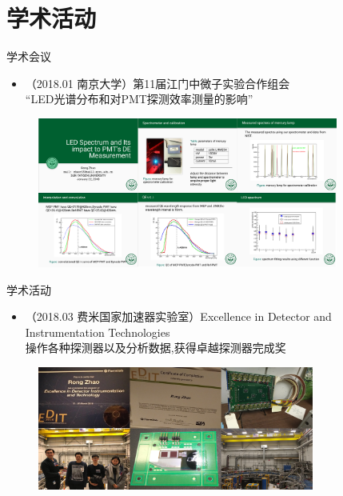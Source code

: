 \documentclass[11pt,compress,xcolor=x11names,UTF8]{beamer}
\begin{document}
\section{学术活动}
\begin{frame}{学术会议}
\begin{itemize}
\item （2018.01 南京大学）第11届江门中微子实验合作组会\\
	\alert{“LED光谱分布和对PMT探测效率测量的影响”}
\end{itemize}
\begin{figure}
\centering
\includegraphics[width=0.88\textwidth]{led} %
\end{figure}
\end{frame}
\begin{frame}{学术活动}
\begin{itemize}
\item （2018.03 费米国家加速器实验室）Excellence in Detector and Instrumentation Technologies\\
	\alert{操作各种探测器以及分析数据,获得卓越探测器完成奖}
\end{itemize}
\begin{figure}
\centering
\includegraphics[width=0.81\textwidth]{edit} %
\end{figure}
\end{frame}
\end{document}
